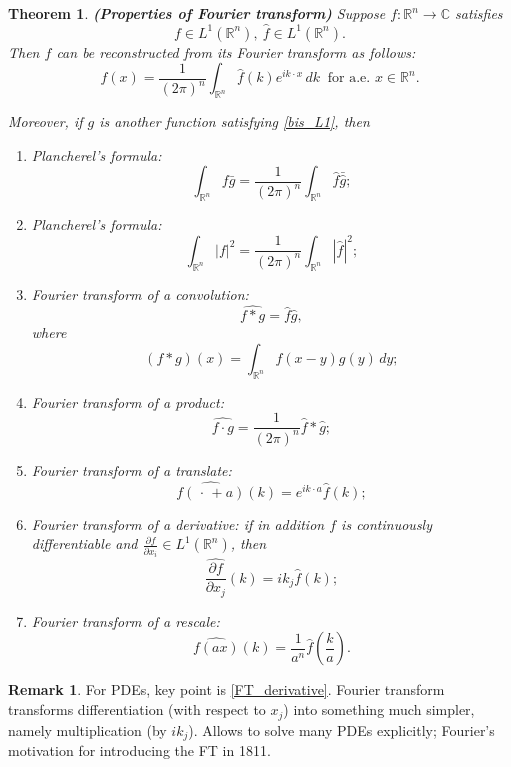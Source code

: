 \documentclass[12pt]{article}
\newtheorem{theorem}{Theorem}[section]
\theoremstyle{definition}
\newtheorem*{remark}{Remark}
\begin{document}
\begin{theorem}\label{properties_FT}
\emph{\textbf{(Properties of Fourier transform)}} Suppose $f:\mathbb{R}^n\rightarrow\mathbb{C}$ satisfies
\begin{equation}\tag{$*$}\label{bis_L1}
f\in L^1(\mathbb{R}^n),\ \hat{f}\in L^1(\mathbb{R}^n).
\end{equation}
Then $f$ can be reconstructed from its Fourier transform as follows:
\begin{equation}\tag{R}\label{Fourier_inverse}
f(x)=\frac{1}{(2\pi)^n}\int_{\mathbb{R}^n}\hat{f}(k)e^{ik\cdot x}\,dk\ \text{ for a.e. }x\in\mathbb{R}^n.
\end{equation}

Moreover, if $g$ is another function satisfying \eqref{bis_L1}, then
\begin{enumerate}[label=\arabic*)]
\item Plancherel's formula:
\[\int_{\mathbb{R}^n}f\bar{g}=\frac{1}{(2\pi)^n}\int_{\mathbb{R}^n}\hat{f}\bar{\hat{g}};\]
\item Plancherel's formula:
\[\int_{\mathbb{R}^n}|f|^2=\frac{1}{(2\pi)^n}\int_{\mathbb{R}^n}|\hat{f}|^2;\]
\item Fourier transform of a convolution:
\[\widehat{f*g}=\hat{f}\hat{g},\]
where
\[(f*g)(x)=\int_{\mathbb{R}^n}f(x-y)g(y)\,dy;\]
\item Fourier transform of a product:
\[\widehat{f\cdot g}=\frac{1}{(2\pi)^n}\hat{f}*\hat{g};\]
\item\label{FT_translate} Fourier transform of a translate:
\[\widehat{f(\,\cdot\,+a)}(k)=e^{ik\cdot a}\hat{f}(k);\]
\item\label{FT_derivative} Fourier transform of a derivative: if in addition $f$ is continuously differentiable and $\frac{\partial f}{\partial x_i}\in L^1(\mathbb{R}^n)$, then
\[\widehat{\frac{\partial f}{\partial x_j}}(k)=ik_j\hat{f}(k);\]
\item Fourier transform of a rescale:
\[\widehat{f(ax)}(k)=\frac{1}{a^n}\hat{f}\left(\frac{k}{a}\right).\]
\end{enumerate}
\end{theorem}

\begin{remark}
For PDEs, key point is \ref{FT_derivative}. Fourier transform transforms differentiation (with respect to $x_j$) into something much simpler, namely multiplication (by $ik_j$). Allows to solve many PDEs explicitly; Fourier's motivation for introducing the FT in 1811.
\end{remark}
\end{document}
